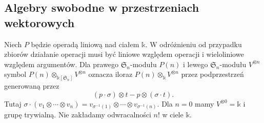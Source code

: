 \subsection{Algebry swobodne w przestrzeniach wektorowych}

Niech $P$ będzie operadą liniową nad ciałem $\mathbb k$. W odróżnieniu od przypadku zbiorów działanie operacji musi być liniowe względem operacji i wieloliniowe względem argumentów. Dla prawego $\mathfrak S_n$-modułu $P(n)$ i lewego $\mathfrak S_n$-modułu $V^{\otimes n}$ symbol $P(n)\otimes_{\mathbb k[\mathfrak S_n]}V^{\otimes n}$ oznacza iloraz $P(n)\otimes_{\mathbb k}V^{\otimes n}$ przez podprzestrzeń generowaną przez
\[
 (p\cdot\sigma)\otimes t-p\otimes(\sigma\cdot t).
\]
Tutaj $\sigma\cdot(v_1\otimes\cdots\otimes v_n)
=v_{\sigma^{-1}(1)}\otimes\cdots\otimes v_{\sigma^{-1}(n)}$. Dla $n=0$ mamy $V^{\otimes0}=\mathbb k$ i grupę trywialną. Nie zakładamy odwracalności $n!$ w ciele $\mathbb k$.


